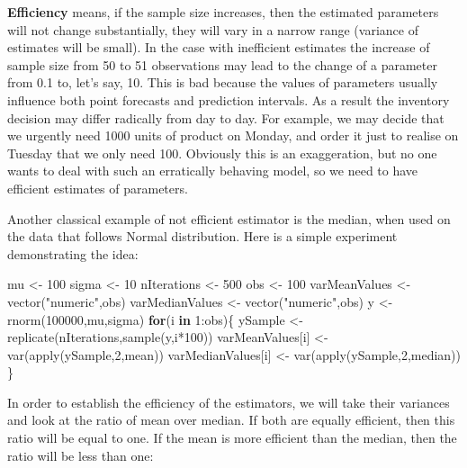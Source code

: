 \documentclass[
]{book}
\newenvironment{Shaded}{\begin{snugshade}}{\end{snugshade}}
\newcommand{\ControlFlowTok}[1]{\textcolor[rgb]{0.13,0.29,0.53}{\textbf{#1}}}
\newcommand{\DecValTok}[1]{\textcolor[rgb]{0.00,0.00,0.81}{#1}}
\newcommand{\FunctionTok}[1]{\textcolor[rgb]{0.00,0.00,0.00}{#1}}
\newcommand{\NormalTok}[1]{#1}
\newcommand{\OtherTok}[1]{\textcolor[rgb]{0.56,0.35,0.01}{#1}}
\newcommand{\SpecialCharTok}[1]{\textcolor[rgb]{0.00,0.00,0.00}{#1}}
\newcommand{\StringTok}[1]{\textcolor[rgb]{0.31,0.60,0.02}{#1}}
\theoremstyle{definition}
\theoremstyle{definition}
\theoremstyle{definition}
\theoremstyle{definition}
\theoremstyle{remark}
\begin{document}
\textbf{Efficiency} means, if the sample size increases, then the estimated parameters will not change substantially, they will vary in a narrow range (variance of estimates will be small). In the case with inefficient estimates the increase of sample size from 50 to 51 observations may lead to the change of a parameter from 0.1 to, let's say, 10. This is bad because the values of parameters usually influence both point forecasts and prediction intervals. As a result the inventory decision may differ radically from day to day. For example, we may decide that we urgently need 1000 units of product on Monday, and order it just to realise on Tuesday that we only need 100. Obviously this is an exaggeration, but no one wants to deal with such an erratically behaving model, so we need to have efficient estimates of parameters.

Another classical example of not efficient estimator is the median, when used on the data that follows Normal distribution. Here is a simple experiment demonstrating the idea:

\begin{Shaded}
\begin{Highlighting}[]
\NormalTok{mu }\OtherTok{\textless{}{-}} \DecValTok{100}
\NormalTok{sigma }\OtherTok{\textless{}{-}} \DecValTok{10}
\NormalTok{nIterations }\OtherTok{\textless{}{-}} \DecValTok{500}
\NormalTok{obs }\OtherTok{\textless{}{-}} \DecValTok{100}
\NormalTok{varMeanValues }\OtherTok{\textless{}{-}} \FunctionTok{vector}\NormalTok{(}\StringTok{"numeric"}\NormalTok{,obs)}
\NormalTok{varMedianValues }\OtherTok{\textless{}{-}} \FunctionTok{vector}\NormalTok{(}\StringTok{"numeric"}\NormalTok{,obs)}
\NormalTok{y }\OtherTok{\textless{}{-}} \FunctionTok{rnorm}\NormalTok{(}\DecValTok{100000}\NormalTok{,mu,sigma)}
\ControlFlowTok{for}\NormalTok{(i }\ControlFlowTok{in} \DecValTok{1}\SpecialCharTok{:}\NormalTok{obs)\{}
\NormalTok{    ySample }\OtherTok{\textless{}{-}} \FunctionTok{replicate}\NormalTok{(nIterations,}\FunctionTok{sample}\NormalTok{(y,i}\SpecialCharTok{*}\DecValTok{100}\NormalTok{))}
\NormalTok{    varMeanValues[i] }\OtherTok{\textless{}{-}} \FunctionTok{var}\NormalTok{(}\FunctionTok{apply}\NormalTok{(ySample,}\DecValTok{2}\NormalTok{,mean))}
\NormalTok{    varMedianValues[i] }\OtherTok{\textless{}{-}} \FunctionTok{var}\NormalTok{(}\FunctionTok{apply}\NormalTok{(ySample,}\DecValTok{2}\NormalTok{,median))}
\NormalTok{\}}
\end{Highlighting}
\end{Shaded}

In order to establish the efficiency of the estimators, we will take their variances and look at the ratio of mean over median. If both are equally efficient, then this ratio will be equal to one. If the mean is more efficient than the median, then the ratio will be less than one:
\end{document}
